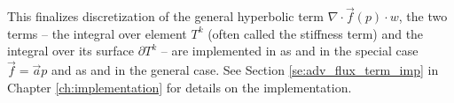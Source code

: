 This finalizes discretization of the general hyperbolic term
$\nabla\cdot\vec{f}(p)
\cdot w$, the two terms -- the integral over element $T^k$ (often called the stiffness
term) and the integral over its surface $\partial T^k$ -- are implemented in \sfepy{}
as  and  in the special
case $\vec{f} = \vec{a}p$ and as  and
 in the general case. See Section
\ref{se:adv_flux_term_imp} in Chapter \ref{ch:implementation} for details on
the implementation.





